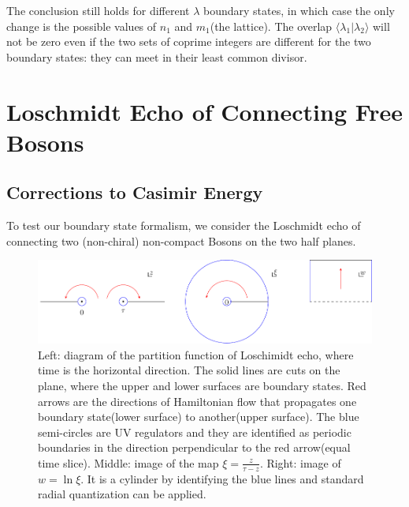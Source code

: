\documentclass{article}
\begin{document}
The conclusion still holds for different $\lambda$ boundary states, in which case the only change is the possible values of $n_1$ and $m_1$(the lattice). The overlap $\langle \lambda_1 | \lambda_2 \rangle $ will not be zero even if the two sets of coprime integers are different for the two boundary states: they can meet in their least common divisor. 




\section{Loschmidt Echo of Connecting Free Bosons}
\subsection{Corrections to Casimir Energy}

To test our boundary state formalism, we consider the Loschmidt echo of connecting two (non-chiral) non-compact Bosons on the two half planes. 


\begin{figure}[h]
\centering
\includegraphics[width=	extwidth]{fig_H-tau}\caption{Left: diagram of the partition function of Loschimidt echo, where time is the horizontal direction. The solid lines are cuts on the plane, where the upper and lower surfaces are boundary states. Red arrows are the directions of Hamiltonian flow that propagates one boundary state(lower surface) to another(upper surface). The blue semi-circles are UV regulators and they are identified as periodic boundaries in the direction perpendicular to the red arrow(equal time slice). Middle: image of the map $\xi = \frac{z}{\tau - z}$. Right: image of $w = \ln \xi$. It is a cylinder by identifying the blue lines and standard radial quantization can be applied. }
\label{fig:H-tau}
\end{figure}


\end{document}
